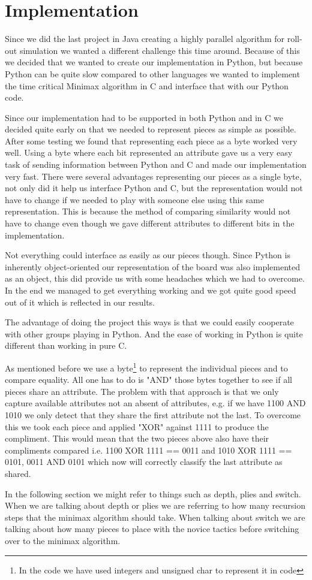 \section{Implementation}\label{implementation}
Since we did the last project in Java creating a highly parallel algorithm for
roll-out simulation we wanted a different challenge this time around. Because
of this we decided that we wanted to create our implementation in Python, but
because Python can be quite slow compared to other languages we wanted to implement the
time critical Minimax algorithm in C and interface that with our Python code.

Since our implementation had to be supported in both Python and in C we decided
quite early on that we needed to represent pieces as simple as possible. After
some testing we found that representing each piece as a byte worked very well.
Using a byte where each bit represented an attribute gave us a very easy task
of sending information between Python and C and made our implementation very
fast. There were several advantages representing our pieces as a single byte,
not only did it help us interface Python and C, but the representation would
not have to change if we needed to play with someone else using this same
representation. This is because the method of comparing similarity would not
have to change even though we gave different attributes to different bits in
the implementation.

Not everything could interface as easily as our pieces though. Since Python is 
inherently object-oriented our representation of the \quarto{} board was also 
implemented as an object, this did provide us with some headaches which we 
had to overcome.
In the end we managed to get everything working and we got quite good speed 
out of it which is reflected in our results.

The advantage of doing the project this ways is that we could easily cooperate
with other groups playing in Python. And the ease of working in Python is
quite different than working in pure C.

As mentioned before we use a byte\footnote{In the code we have used integers and
unsigned char to represent it in code} to represent the individual pieces and to
compare equality. All one has to do is "AND" those bytes together to see if all
pieces share an attribute. The problem with that approach is that we only capture
available attributes not an absent of attributes, e.g. if we have 1100 AND 1010
we only detect that they share the first attribute not the last. To overcome this
we took each piece and applied "XOR" against 1111 to produce the compliment.
This would mean that the two pieces above also have their compliments compared
i.e. 1100 XOR 1111 == 0011 and 1010 XOR 1111 == 0101, 0011 AND 0101 which now will correctly
classify the last attribute as shared.

In the following section we might refer to things such as depth, plies and switch.
When we are talking about depth or plies we are referring to how many recursion
steps that the minimax algorithm should take. When talking about switch we are
talking about how many pieces to place with the novice tactics before switching
over to the minimax algorithm.
